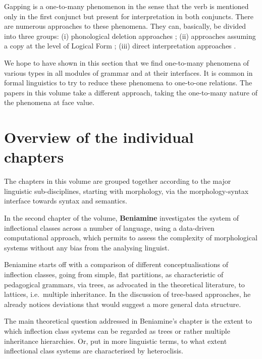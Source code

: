 \documentclass[output=paper]{langscibook}
\begin{document}
Gapping is a one-to-many phenomenon in the sense that the verb is mentioned only in the first conjunct but present for interpretation in both conjuncts.
There are numerous approaches to these phenomena. They can, basically, be divided into three groups: (i) phonological deletion approaches 
\citep{Merchant:01,Fox:Lasnik:03}; (ii) approaches assuming a copy at the level of Logical Form \citep{Lobeck:95,Chung:al:95%
}; 
(iii) direct interpretation approaches \citep{Ginzburg:Sag:00,Culicover:Jackendoff:05,Kubota:Levine:16-Gapping}. 
%

We hope to have shown in this section that we find one-to-many
phenomena of various types in all modules of grammar and at their
interfaces.  It is common in formal linguistics to try to reduce these
phenomena to one-to-one relations.  The papers in this volume take a
different approach, taking the one-to-many nature of the phenomena at
face value.

\section{Overview of the individual chapters}

The chapters in this volume are grouped together according to the
major linguistic sub-disciplines, starting with morphology, via the
morphology-syntax interface towards syntax and semantics.  

In the second chapter of the volume, \textbf{Beniamine} investigates
the system of inflectional classes across a number of language, using
a data-driven computational approach, which permits to assess the
complexity of morphological systems without any bias from the
analysing linguist.

Beniamine starts off with a comparison of different conceptualisations
of inflection classes, going from simple, flat partitions, as
characteristic of pedagogical grammars, via trees, as advocated in the
theoretical literature, to lattices, i.e.\  multiple
inheritance.  In the discussion of tree-based approaches, he already
notices deviations that would suggest a more general data
structure. 

The main theoretical question addressed in Beniamine's chapter is the
extent to which inflection class systems can be regarded as trees or
rather multiple inheritance hierarchies. Or, put in more linguistic
terms, to what extent inflectional class systems are characterised by
heteroclisis.
\end{document}
